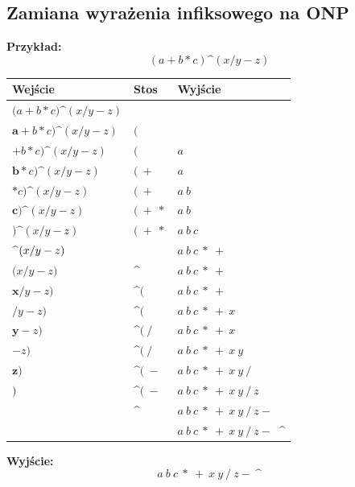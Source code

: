 \documentclass[12pt]{article}
\begin{document}
    \subsection{Zamiana wyrażenia infiksowego na ONP}
    \textbf{Przykład:}
    \[(a+b*c)\text{\textasciicircum}(x/y - z)\]

    \begin{table}[H]
        \begin{tabular}{|p{5cm}|p{5cm}|p{5cm}|}
            \hline
            \textbf{Wejście} & \textbf{Stos} & \textbf{Wyjście}\\
            \hline
            \hline
            $\boldsymbol{(}a+b*c)\text{\textasciicircum}(x/y - z)$ &&\\
            $\mathbf{a}+b*c)\text{\textasciicircum}(x/y - z)$ & $($ &\\
            $\boldsymbol{+}b*c)\text{\textasciicircum}(x/y - z)$ & $($ & $a$\\
            $\mathbf{b}*c)\text{\textasciicircum}(x/y - z)$ & $( ~ +$ & $a$\\
            $\boldsymbol{*}c)\text{\textasciicircum}(x/y - z)$  & $( ~ +$ & $a ~ b$\\
            $\mathbf{c})\text{\textasciicircum}(x/y - z)$  & $( ~ + ~ *$ & $a ~ b$\\
            $\boldsymbol{)}\text{\textasciicircum}(x/y - z)$  & $( ~ + ~ *$ & $a ~ b ~ c$\\
            $\text{\textbf{\textasciicircum}}(x/y - z)$  & & $a ~ b ~ c ~ * ~ +$\\
            $\boldsymbol{(}x/y - z)$  & \textasciicircum & $a ~ b ~ c ~ * ~ +$\\
            $\mathbf{x}/y - z)$  & \textasciicircum $($ & $a ~ b ~ c ~ * ~ +$\\
            $\boldsymbol{/}y - z)$  & \textasciicircum $($ & $a ~ b ~ c ~ * ~ + ~ x$\\
            $\mathbf{y} - z)$  & \textasciicircum $( ~ / $ & $a ~ b ~ c ~ * ~ + ~ x$\\
            $\boldsymbol{-} z)$  & \textasciicircum $( ~ / $ & $a ~ b ~ c ~ * ~ + ~ x ~ y$\\
            $\mathbf{z})$  & \textasciicircum $( ~ - $ & $a ~ b ~ c ~ * ~ + ~ x ~ y ~ /$\\
            $\boldsymbol{)}$  & \textasciicircum $( ~ - $ & $a ~ b ~ c ~ * ~ + ~ x ~ y ~ / ~ z$\\
            & \textasciicircum & $a ~ b ~ c ~ * ~ + ~ x ~ y ~ / ~ z -$\\
            & & $a ~ b ~ c ~ * ~ + ~ x ~ y ~ / ~ z - ~ $ \textasciicircum\\
            \hline
        \end{tabular}
    \end{table}
    \textbf{Wyjście:}
    \[a ~ b ~ c ~ * ~ + ~ x ~ y ~ / ~ z - ~ \text{\textasciicircum}\]
\end{document}
